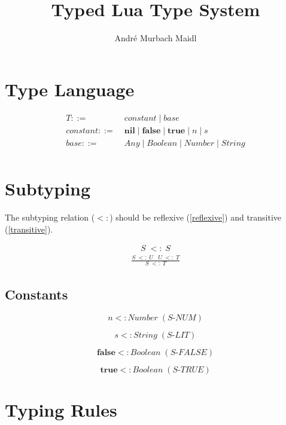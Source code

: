 \documentclass[12pt]{article}
\title{Typed Lua Type System}
\author{André Murbach Maidl}
\begin{document}
\maketitle

\section{Type Language}

\begin{align*}
T ::= \; & constant \; | \; base\\
constant ::= \; & \textbf{nil} \; | \; \textbf{false} \; | \; \textbf{true} \;
 | \; n \; | \; s\\
base ::= \; & Any \; | \; Boolean \; | \; Number \; | \; String\\
\end{align*}

\section{Subtyping}

The subtyping relation ($<:$) should be reflexive (\ref{reflexive})
and transitive (\ref{transitive}).

\begin{align}
\label{reflexive}
S \; <: \; S
\end{align}
\begin{align}
\label{transitive}
\frac{S \; <: \; U \;\;\; U\;  <: \; T}{S \; <: \; T}
\end{align}

\subsection{Constants}

\[
n <: Number \; (\textit{S-NUM})
\]

\[
s <: String \; (\textit{S-LIT})
\]

\[
\textbf{false} <: Boolean \; (\textit{S-FALSE})
\]

\[
\textbf{true} <: Boolean \; (\textit{S-TRUE})
\]

%

\section{Typing Rules}
\end{document}
